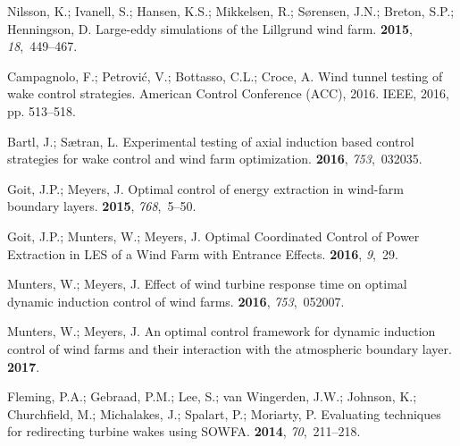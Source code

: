 \documentclass[energies,article,submit,moreauthors,latex,10pt,a4paper]{mdpi}
\begin{document}
\begin{thebibliography}{999}
	Nilsson, K.; Ivanell, S.; Hansen, K.S.; Mikkelsen, R.; S{\o}rensen, J.N.;
	Breton, S.P.; Henningson, D.
	\newblock Large-eddy simulations of the Lillgrund wind farm.
	 {\bf 2015}, {\em 18},~449--467.
	
	Campagnolo, F.; Petrovi{\'c}, V.; Bottasso, C.L.; Croce, A.
	\newblock Wind tunnel testing of wake control strategies.
	\newblock  American Control Conference (ACC), 2016. IEEE,  2016, pp. 513--518.
	
	Bartl, J.; S{\ae}tran, L.
	\newblock Experimental testing of axial induction based control strategies for
	wake control and wind farm optimization.
	 {\bf 2016}, {\em
		753},~032035.
	
	Goit, J.P.; Meyers, J.
	\newblock Optimal control of energy extraction in wind-farm boundary layers.
	 {\bf 2015}, {\em 768},~5--50.
	
	Goit, J.P.; Munters, W.; Meyers, J.
	\newblock Optimal Coordinated Control of Power Extraction in {LES} of a Wind
	Farm with Entrance Effects.
	 {\bf 2016}, {\em 9},~29.
	
	Munters, W.; Meyers, J.
	\newblock Effect of wind turbine response time on optimal dynamic induction
	control of wind farms.
	 {\bf 2016}, {\em
		753},~052007.
	
	Munters, W.; Meyers, J.
	\newblock An optimal control framework for dynamic induction control of wind
	farms and their interaction with the atmospheric boundary layer.
	 {\bf 2017}.
	
	Fleming, P.A.; Gebraad, P.M.; Lee, S.; van Wingerden, J.W.; Johnson, K.;
	Churchfield, M.; Michalakes, J.; Spalart, P.; Moriarty, P.
	\newblock Evaluating techniques for redirecting turbine wakes using SOWFA.
	 {\bf 2014}, {\em 70},~211--218.
	

\end{thebibliography}
\end{document}
